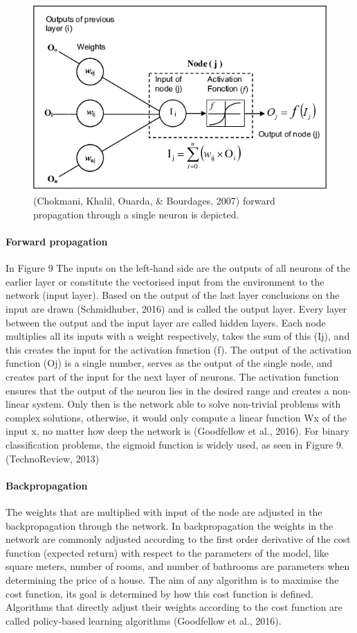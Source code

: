 \begin{figure}[h]
	\includegraphics[width=\columnwidth]{fig9.png} 
	\caption{(Chokmani, Khalil, Ouarda, \& Bourdages, 2007) forward propagation through a single neuron is depicted.}
\end{figure}
\paragraph{Forward propagation}
In Figure 9  The inputs on the left-hand side are the outputs of all neurons of the earlier layer or constitute the vectorised input from the environment to the network (input layer). Based on the output of the last layer conclusions on the input are drawn (Schmidhuber, 2016) and is called the output layer. Every layer between the output and the input layer are called hidden layers. Each node multiplies all its inputs with a weight respectively, takes the sum of this (Ij), and this creates the input for the activation function (f). The output of the activation function (Oj) is a single number, serves as the output of the single node, and creates part of the input for the next layer of neurons. The activation function ensures that the output of the neuron lies in the desired range and creates a non-linear system. Only then is the network able to solve non-trivial problems with complex solutions, otherwise, it would only compute a linear function Wx of the input x, no matter how deep the network is (Goodfellow et al., 2016). For binary classification problems, the sigmoid function is widely used, as seen in Figure 9. (TechnoReview, 2013)

\paragraph{Backpropagation}
The weights that are multiplied with input of the node are adjusted in the backpropagation through the network. In backpropagation the weights in the network are commonly adjusted according to the first order derivative of the cost function (expected return) with respect to the parameters of the model, like square meters, number of rooms, and number of bathrooms are parameters when determining the price of a house. The aim of any algorithm is to maximise the cost function, its goal is determined by how this cost function is defined. Algorithms that directly adjust their weights according to the cost function are called policy-based learning algorithms (Goodfellow et al., 2016).


